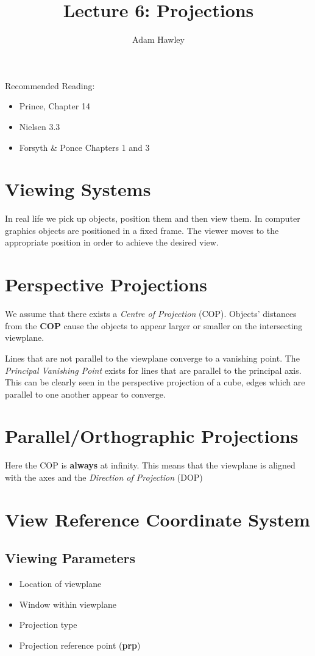 \documentclass{article}
\author{Adam Hawley}
\title{Lecture 6: Projections}
\begin{document}
\maketitle
Recommended Reading: 
\begin{itemize}
	\item Prince, Chapter 14 
	\item Nielsen 3.3
	\item Forsyth \& Ponce Chapters 1 and 3
\end{itemize}

\section{Viewing Systems}
In real life we pick up objects, position them and then view them.
In computer graphics objects are positioned in a fixed frame.
The viewer moves to the appropriate position in order to achieve the desired view.

\section{Perspective Projections}
We assume that there exists a {\it Centre of Projection} (COP).
Objects' distances from the {\bf COP} cause the objects to appear larger or smaller on the intersecting viewplane. %

Lines that are not parallel to the viewplane converge to a vanishing point. 
The {\it Principal Vanishing Point} exists for lines that are parallel to the principal axis.  
This can be clearly seen in the perspective projection of a cube, edges which are parallel to one another appear to converge. %

\section{Parallel/Orthographic Projections}
Here the COP is {\bf always} at infinity.
This means that the viewplane is aligned with the axes and the {\it Direction of Projection} (DOP)

\section{View Reference Coordinate System}
\subsection{Viewing Parameters}
\begin{itemize}
	\item Location of viewplane
	\item Window within viewplane
	\item Projection type
	\item Projection reference point ({\bf prp})
\end{itemize} 
\end{document}
